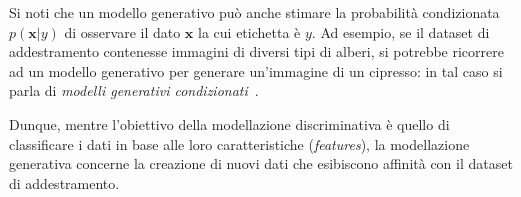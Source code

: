 \begin{oss}
Si noti che un modello generativo può anche stimare la probabilità condizionata $p(\mathbf{x}|y)$ di osservare il dato $\mathbf{x}$ la cui etichetta è $y$. 
Ad esempio, se il dataset di addestramento contenesse immagini di diversi tipi di alberi, si potrebbe ricorrere ad un modello generativo per generare un'immagine di un cipresso: in tal caso si parla di 
\emph{modelli generativi condizionati}~\cite{fosterGenerativeDeepLearning2023}.
\end{oss}


\noindent Dunque, mentre l'obiettivo della modellazione discriminativa è quello di classificare i dati in base alle loro caratteristiche (\emph{features}), 
la modellazione generativa concerne la creazione di nuovi dati che esibiscono affinità con il dataset di addestramento.

